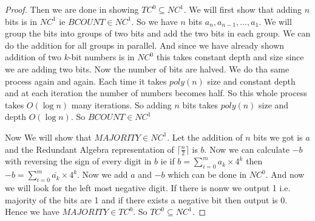 \begin{proof}
	Then we are done in showing $TC^0\subseteq NC^1$. We will first show that adding $n$ bits is in $NC^1$ ie $BCOUNT\in NC^1$. So we have $n$ bits $a_n,a_{n-1},\dots, a_1$. We will group the bits into groups of two bits and add the two bits in each group. We can do the addition for all groups in parallel. And since we have already shown addition of two $k$-bit numbers is in $NC^0$ this takes constant depth and size since we are adding two bits. Now the number of bits are halved. We do tha same process again and again. Each time it takes $poly(n)$ size and constant depth and at each iteration the number of numbers becomes half. So this whole process takes $O(\log n)$ many iterations. So adding $n$ bits takes $poly(n)$ size and depth $O(\log n)$. So $BCOUNT\in NC^1$
	
	
	
	Now We will show that $MAJORITY\in NC^1$. Let the addition of $n$ bits we got is $a$ and the Redundant Algebra representation of $\lceil\frac{n}2\rceil$ is $b$. Now we can calculate $-b$ with reversing the sign of every digit in $b$ ie if $b=\sum\limits_{i=0}^{m}a_k\times 4^k$ then $-b=\sum\limits_{i=0}^m\overline{a_k}\times 4^k$. Now we add $a$ and $-b$ which can be done in $NC^0$. And now we will look for the left most negative digit. If there is nonw we output 1 i.e. majority of the bits are 1 and if there exists a negative bit then output is 0. Hence we have $MAJORITY\in TC^0$. So $TC^0\subseteq NC^1$.
\end{proof}

